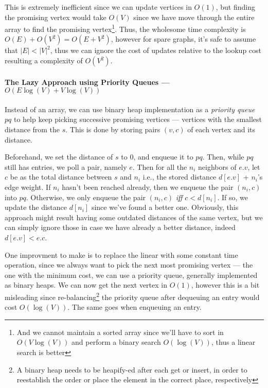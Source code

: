 \documentclass[12pt]{article}
\begin{document}


This is extremely inefficient since we can update vertices in $O(1)$, but finding the promising vertex would take $O(V)$ since we have move through the entire array to find the promising vertex\footnote{And we cannot maintain a sorted array since we'll have to sort in $O(V\log(V))$ and perform a binary search $O(\log(V))$, thus a linear search is better}. Thus, the wholesome time complexity is $O(E) + O(V^2) = O(E + V^2)$, however for spare graphs, it's safe to assume that $|E| < |V|^2$, thus we can ignore the cost of updates relative to the lookup cost resulting a complexity of $O(V^2)$.

\paragraph{The Lazy Approach using Priority Queues --- $O(E\log(V) + V\log(V))$}

Instead of an array, we can use binary heap implementation as a \textit{priority queue} $pq$ to help keep picking successive promising vertices ---  vertices with the smallest distance from the $s$. This is done by storing pairs $(v,c)$ of each vertex and its distance.

Beforehand, we set the distance of $s$ to $0$, and enqueue it to $pq$. Then, while $pq$ still has entries, we poll a pair, namely $e$. Then for all the $n_i$ neighbors of $e.v$, let $c$ be as the total distance between $s$ and $n_i$ i.e., the stored distance $d[e.v]$ + $n_i$'s edge weight. If $n_i$ hasn't been reached already, then we enqueue the pair $(n_i,c)$ into $pq$. Otherwise, we only enqueue the pair $(n_i,c)$ \textit{iff} $c < d[n_i]$. If so, we update the distance $d[n_i]$ since we've found a better one. Obviously, this approach might result having some outdated distances of the same vertex, but we can simply ignore those in case we have already a better distance, indeed $d[e.v] < e.c$.



 One improvment to make is to replace the linear with some constant time operation, since we always want to pick the next most promising vertex --- the one with the minimum cost, we can use a priority queue, generally implemented as binary heaps. We can now get the next vertex in $O(1)$, however this is a bit misleading since re-balancing\footnote{A binary heap needs to be heapify-ed after each get or insert, in order to reestablish the order or place the element in the correct place, respectively} the priority queue after dequeuing an entry would cost $O(\log(V))$. The same goes when enqueuing an entry.
\end{document}
